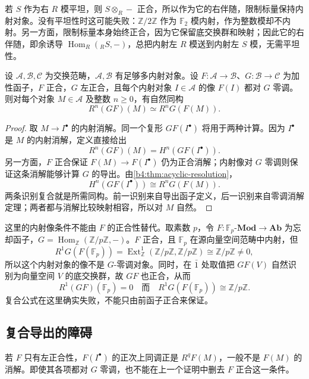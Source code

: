 \ProseParagraphBreak
若 \(S\) 作为右 \(R\) 模平坦，则 \(S\otimes_R-\) 正合，所以作为它的右伴随，限制标量保持内射对象。没有平坦性时这可能失败：\(\mathbb Z/2\mathbb Z\) 作为 \(\mathbb F_2\) 模内射，作为整数模却不内射。另一方面，限制标量本身始终正合，因为它保留底交换群和映射；因此它的右伴随，即余诱导 \(\operatorname{Hom}_R({}_RS,-)\)，总把内射左 \(R\) 模送到内射左 \(S\) 模，无需平坦性。

\begin{theorem}\label{b4:thm:derived-composite-exact-first}
	设 \(\mathcal A,\mathcal B,\mathcal C\) 为交换范畴，\(\mathcal A,\mathcal B\) 有足够多内射对象。设 \(F:\mathcal A\to\mathcal B\)、\(G:\mathcal B\to\mathcal C\) 为加性函子，\(F\) 正合，\(G\) 左正合，且每个内射对象 \(I\in\mathcal A\) 的像 \(F(I)\) 都对 \(G\) 零调。则对每个对象 \(M\in\mathcal A\) 及整数 \(n\ge0\)，有自然同构
	\[
		R^n(GF)(M)\simeq R^nG(F(M)).
	\]
\end{theorem}
\begin{proof}
	取 \(M\to I^\bullet\) 的内射消解。同一个复形 \(GF(I^\bullet)\) 将用于两种计算。因为 \(I^\bullet\) 是 \(M\) 的内射消解，定义直接给出
	\[
		R^n(GF)(M)=H^n(GF(I^\bullet)).
	\]
	另一方面，\(F\) 正合保证 \(F(M)\to F(I^\bullet)\) 仍为正合消解；内射像对 \(G\) 零调则保证这条消解能够计算 \(G\) 的导出。由\cref{b4:thm:acyclic-resolution}，
	\[
		H^n(GF(I^\bullet))\cong R^nG(F(M)).
	\]
	两条识别复合就是所需同构。前一识别来自导出函子定义，后一识别来自零调消解定理；两者都与消解比较映射相容，所以对 \(M\) 自然。
\end{proof}

这里的内射像条件不能由 \(F\) 的正合性替代。取素数 \(p\)，令 \(F:\mathbb F_p\text{-}\mathbf{Mod}\to\mathbf{Ab}\) 为忘却函子，\(G=\operatorname{Hom}_{\mathbb Z}(\mathbb Z/p\mathbb Z,-)\)。\(F\) 正合，且 \(\mathbb F_p\) 在源向量空间范畴中内射，但
\[
	R^1G(F(\mathbb F_p)) =\operatorname{Ext}_{\mathbb Z}^1(\mathbb Z/p\mathbb Z,\mathbb Z/p\mathbb Z) \cong\mathbb Z/p\mathbb Z\ne0,
\]
所以这个内射对象的像不是 \(G\)-零调对象。同时，在 \(\bar1\) 处取值把 \(GF(V)\) 自然识别为向量空间 \(V\) 的底交换群，故 \(GF\) 也正合，从而
\[
	R^1(GF)(\mathbb F_p)=0 \quad\text{而}\quad R^1G(F(\mathbb F_p))\cong\mathbb Z/p\mathbb Z.
\]
复合公式在这里确实失败，不能只由前函子正合来保证。

\subsection{复合导出的障碍}
\label{b4:subsec:1004:02}

若 \(F\) 只有左正合性，\(F(I^\bullet)\) 的正次上同调正是 \(R^qF(M)\)，一般不是 \(F(M)\) 的消解。即使其各项都对 \(G\) 零调，也不能在上一个证明中删去 \(F\) 正合这一条件。

